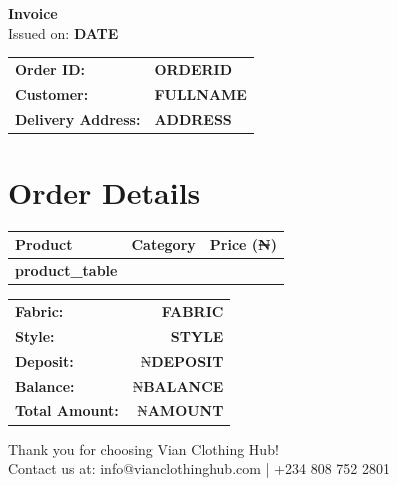 \documentclass[a4paper,12pt]{article}
\begin{document}
\begin{center}
    \color{vianpurple}
    \textbf{\Large Invoice} \\
    \vspace{0.5cm}
    \color{black}
    \small Issued on: \textbf{DATE}
\end{center}

\vspace{1cm}

\begin{tabular}{ll}
    \textbf{Order ID:} & \textbf{ORDERID} \\
    \textbf{Customer:} & \textbf{FULLNAME} \\
    \textbf{Delivery Address:} & \textbf{ADDRESS} \\
\end{tabular}

\vspace{1cm}

\section*{Order Details}
\begin{tabular}{p{6cm} p{4cm} r}
    \toprule
    \textbf{Product} & \textbf{Category} & \textbf{Price (₦)} \\
    \midrule
    \textbf{product_table}
    \bottomrule
\end{tabular}

\vspace{0.5cm}

\begin{tabular}{lr}
    \textbf{Fabric:} & \textbf{FABRIC} \\
    \textbf{Style:} & \textbf{STYLE} \\
    \textbf{Deposit:} & ₦\textbf{DEPOSIT} \\
    \textbf{Balance:} & ₦\textbf{BALANCE} \\
    \midrule
    \textbf{Total Amount:} & ₦\textbf{AMOUNT} \\
\end{tabular}

\vspace{1cm}

\begin{center}
    \color{vianpurple}
    \small Thank you for choosing Vian Clothing Hub! \\
    \small Contact us at: info@vianclothinghub.com | +234 808 752 2801
\end{center}
\end{document}
